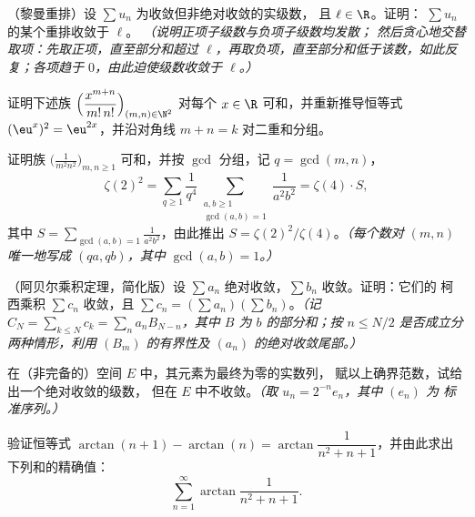 \begin{exercise}[$\star\star\star$]\label{exo:b2:series:5}
（黎曼重排）设 $\sum u_n$ 为收敛但非绝对收敛的实级数，
且 $\ell \in \R$。证明：
$\sum u_n$ 的某个重排收敛于 $\ell$。
\emph{（说明正项子级数与负项子级数均发散；
然后贪心地交替取项：先取正项，直至部分和超过
$\ell$，再取负项，直至部分和低于该数，如此反复；各项趋于
$0$，由此迫使级数收敛于 $\ell$。）}
\end{exercise}

\begin{exercise}[$\star\star$]\label{exo:b2:series:6}
证明下述族
$\Bigl(\dfrac{x^{m+n}}{m!\,n!}\Bigr)_{(m,n)\in\N^2}$ 对每个
$x \in \R$ 可和，并重新推导恒等式 $(\eu^x)^2 =
\eu^{2x}$，并沿对角线 $m + n =
k$ 对二重和分组。
\end{exercise}

\begin{exercise}[$\star\star$]\label{exo:b2:series:7}
证明族 $\bigl(\frac{1}{m^2 n^2}\bigr)_{m,n \geq 1}$
可和，并按 $\gcd$ 分组，记 $q = \gcd(m,n)$，
\[
\zeta(2)^2 = \sum_{q\geq1} \frac{1}{q^4}
\sum_{\substack{a,b \geq 1\\ \gcd(a,b)=1}} \frac{1}{a^2b^2}
= \zeta(4) \cdot S,
\]
其中 $S = \sum_{\gcd(a,b)=1} \frac{1}{a^2b^2}$，由此推出 $S =
\zeta(2)^2/\zeta(4)$。\emph{（每个数对 $(m,n)$ 唯一地写成
$(qa, qb)$，其中 $\gcd(a,b) = 1$。）}
\end{exercise}

\begin{exercise}[$\star\star\star$]\label{exo:b2:series:8}
（阿贝尔乘积定理，简化版）设 $\sum a_n$
绝对收敛，$\sum b_n$ 收敛。证明：它们的
柯西乘积 $\sum c_n$ 收敛，且 $\sum c_n = (\sum
a_n)(\sum b_n)$。\emph{（记 $C_N = \sum_{k\leq N} c_k = \sum_n
a_n B_{N-n}$，其中 $B$ 为 $b$ 的部分和；按
$n \leq N/2$ 是否成立分两种情形，利用 $(B_m)$ 的有界性及
$(a_n)$ 的绝对收敛尾部。）}
\end{exercise}

\begin{exercise}[$\star\star\star$]\label{exo:b2:series:9}
在（非完备的）空间 $E$ 中，其元素为最终为零的实数列，
赋以上确界范数，试给出一个绝对收敛的级数，
但在 $E$ 中不收敛。\emph{（取 $u_n = 2^{-n} e_n$，其中 $(e_n)$ 为
标准序列。）}
\end{exercise}

\begin{exercise}[$\star\star$]\label{exo:b2:series:10}
验证恒等式 $\arctan(n+1) - \arctan(n) =
\arctan\dfrac{1}{n^2 + n + 1}$，并由此求出下列和的精确值：
\[
\sum_{n=1}^{\infty} \arctan\frac{1}{n^2 + n + 1} .
\]
\end{exercise}


